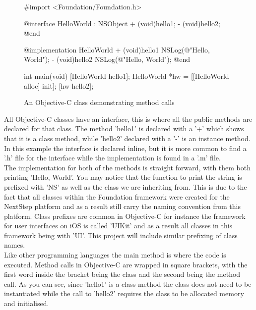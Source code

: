 \documentclass[12pt]{report}
\begin{document}
\begin{figure}[H]
\begin{objccode}
#import <Foundation/Foundation.h>

@interface HelloWorld : NSObject
+ (void)hello1;
- (void)hello2;
@end

@implementation HelloWorld
+ (void)hello1 
{
    NSLog(@"Hello, World");
}
- (void)hello2 
{
    NSLog(@"Hello, World");
}
@end

int main(void) 
{
    [HelloWorld hello1];
    HelloWorld *hw = [[HelloWorld alloc] init];
    [hw hello2];
}
\end{objccode}
\caption{An Objective-C class demonstrating method calls}
\label{fig:helloworld}
\end{figure}

All Objective-C classes have an interface, this is where all the public methods are declared for that class. The method 'hello1' is declared with a '+' which shows that it is a class method, while 'hello2' declared with a '-' is an instance method. In this example the interface is declared inline, but it is more common to find a '.h' file for the interface while the implementation is found in a '.m' file.\\ 

The implementation for both of the methods is straight forward, with them both printing 'Hello, World'. You may notice that the function to print the string is prefixed with 'NS' as well as the class we are inheriting from. This is due to the fact that all classes within the Foundation framework were created for the NextStep platform and as a result still carry the naming convention from this platform. Class prefixes are common in Objective-C for instance the framework for user interfaces on iOS is called 'UIKit' and as a result all classes in this framework being with 'UI'. This project will include similar prefixing of class names.\\

Like other programming languages the main method is where the code is executed. Method calls in Objective-C are wrapped in square brackets, with the first word inside the bracket being the class and the second being the method call. As you can see, since 'hello1' is a class method the class does not need to be instantiated while the call to 'hello2' requires the class to be allocated memory and initialised.\\
\end{document}
